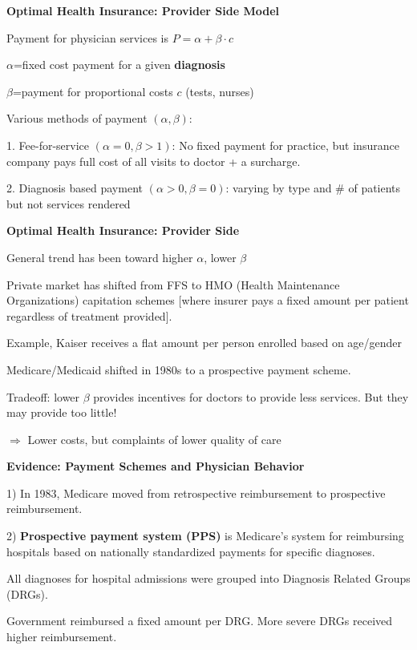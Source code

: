 \documentclass[landscape]{slides}
\begin{document}
\begin{slide}
\begin{center}
{\bf Optimal Health Insurance: Provider Side Model}
\end{center}
Payment for physician services is $P = \alpha + \beta \cdot c$

$\alpha$=fixed cost payment for a given \textbf{diagnosis}

$\beta$=payment for proportional costs $c$ (tests, nurses)



Various methods of payment $(\alpha, \beta)$:



1. Fee-for-service $(\alpha=0, \beta>1)$: No fixed payment for practice, but insurance company pays full cost of all visits to doctor + a surcharge.


2. Diagnosis based payment  $(\alpha>0, \beta=0)$: varying by type and \# of patients but not services rendered


\end{slide}


\begin{slide}
\begin{center}
{\bf Optimal Health Insurance: Provider Side}
\end{center}
General trend has been toward higher $\alpha$, lower $\beta$

Private market has shifted from FFS to HMO (Health Maintenance Organizations) capitation schemes [where insurer pays a fixed
amount per patient regardless of treatment provided]. 

Example, Kaiser receives a flat amount per person enrolled based on age/gender

Medicare/Medicaid shifted in 1980s to a prospective payment scheme.

Tradeoff: lower $\beta$ provides incentives for doctors to provide less services. But they may provide too little!

$\Rightarrow$ Lower costs, but complaints of lower quality of care

\end{slide}


\begin{slide}
\begin{center}
{\bf Evidence: Payment Schemes and Physician Behavior}
\end{center}
1) In 1983, Medicare moved from retrospective reimbursement to prospective reimbursement.

2) \textbf{Prospective payment system (PPS)} is Medicare's system for reimbursing hospitals based on nationally standardized payments for specific diagnoses.

All diagnoses for hospital admissions were grouped into Diagnosis Related Groups (DRGs).

Government reimbursed a fixed amount per DRG. More severe DRGs received higher reimbursement.

\end{slide}
\end{document}
